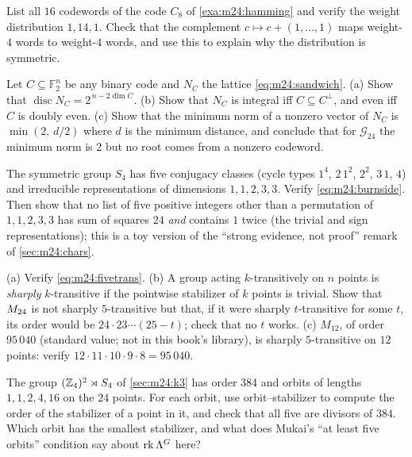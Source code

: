 \begin{exercise}\label{ex:m24:hamming}
List all $16$ codewords of the code $C_8$ of \cref{exa:m24:hamming} and verify the weight
distribution $1,14,1$. Check that the complement $c\mapsto c+(1,\dots,1)$ maps weight-$4$
words to weight-$4$ words, and use this to explain why the distribution is symmetric.
\end{exercise}

\begin{exercise}\label{ex:m24:constrA}
Let $C\subseteq\mathbb F_2^n$ be any binary code and $N_C$ the lattice \eqref{eq:m24:sandwich}.
(a) Show that $\operatorname{disc}N_C=2^{\,n-2\dim C}$. (b) Show that $N_C$ is integral
iff $C\subseteq C^\perp$, and even iff $C$ is doubly even. (c) Show that the minimum norm
of a nonzero vector of $N_C$ is $\min(2,\,d/2)$ where $d$ is the minimum distance, and
conclude that for $\mathcal G_{24}$ the minimum norm is $2$ but no root comes from a
nonzero codeword.
\end{exercise}

\begin{exercise}\label{ex:m24:S4}
The symmetric group $S_4$ has five conjugacy classes (cycle types $1^4$, $2\,1^2$, $2^2$,
$3\,1$, $4$) and irreducible representations of dimensions $1,1,2,3,3$. Verify
\eqref{eq:m24:burnside}. Then show that no list of five positive integers other than a
permutation of $1,1,2,3,3$ has sum of squares $24$ \emph{and} contains $1$ twice (the
trivial and sign representations); this is a toy version of the ``strong evidence, not
proof'' remark of \cref{sec:m24:chars}.
\end{exercise}

\begin{exercise}\label{ex:m24:fivepoints}
(a) Verify \eqref{eq:m24:fivetrans}. (b) A group acting $k$-transitively on $n$ points is
\emph{sharply} $k$-transitive if the pointwise stabilizer of $k$ points is trivial. Show that
$M_{24}$ is not sharply $5$-transitive but that, if it were sharply $t$-transitive for some
$t$, its order would be $24\cdot23\cdots(25-t)$; check that no $t$ works. (c) $M_{12}$, of
order $95\,040$ (standard value; not in this book's library), is sharply $5$-transitive on
$12$ points: verify $12\cdot11\cdot10\cdot9\cdot8=95\,040$.
\end{exercise}

\begin{exercise}\label{ex:m24:fermat}
The group $(\mathbb{Z}_4)^2\rtimes S_4$ of \cref{sec:m24:k3} has order $384$ and orbits of lengths
$1,1,2,4,16$ on the $24$ points. For each orbit, use orbit--stabilizer to compute the order
of the stabilizer of a point in it, and check that all five are divisors of $384$. Which
orbit has the smallest stabilizer, and what does Mukai's ``at least five orbits'' condition
say about $\operatorname{rk}\Lambda^G$ here?
\end{exercise}

